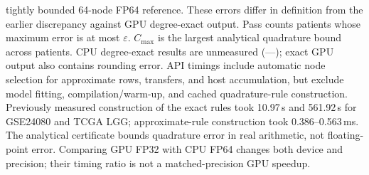 \begin{table}[t]
{tightly bounded 64-node FP64 reference. These errors differ in definition
from the earlier discrepancy against GPU degree-exact output.
Pass counts patients whose maximum error is at most $\varepsilon$.
$C_{\max}$ is the largest analytical quadrature bound across patients.
CPU degree-exact results are unmeasured (---); exact GPU output also contains
rounding error. API timings include automatic node selection for approximate rows, transfers,
and host accumulation, but exclude model fitting, compilation/warm-up,
and cached quadrature-rule construction. Previously measured construction
of the exact rules took 10.97\,s and 561.92\,s for GSE24080 and TCGA LGG;
approximate-rule construction took 0.386--0.563\,ms.
The analytical certificate bounds quadrature error in real arithmetic,
not floating-point error. Comparing GPU FP32 with CPU FP64 changes both
device and precision; their timing ratio is not a matched-precision GPU speedup.}
\label{tab:cox-cpu-gpu-precision}
\end{table}
